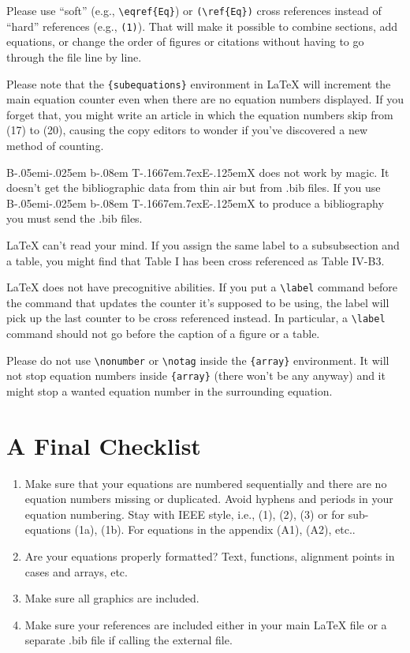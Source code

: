 \documentclass[lettersize,journal]{IEEEtran}
\def\BibTeX{{\rm B\kern-.05em{\sc i\kern-.025em b}\kern-.08em
    T\kern-.1667em\lower.7ex\hbox{E}\kern-.125emX}}
\begin{document}
Please use ``soft'' (e.g., \verb|\eqref{Eq}|) or \verb|(\ref{Eq})|
cross references instead of ``hard'' references (e.g., \verb|(1)|).
That will make it possible to combine sections, add equations, or
change the order of figures or citations without having to go through
the file line by line.

Please note that the \verb|{subequations}| environment in {\LaTeX}
will increment the main equation counter even when there are no
equation numbers displayed. If you forget that, you might write an
article in which the equation numbers skip from (17) to (20), causing
the copy editors to wonder if you've discovered a new method of
counting.

{\BibTeX} does not work by magic. It doesn't get the bibliographic
data from thin air but from .bib files. If you use {\BibTeX} to produce a
bibliography you must send the .bib files. 

{\LaTeX} can't read your mind. If you assign the same label to a
subsubsection and a table, you might find that Table I has been cross
referenced as Table IV-B3. 

{\LaTeX} does not have precognitive abilities. If you put a
\verb|\label| command before the command that updates the counter it's
supposed to be using, the label will pick up the last counter to be
cross referenced instead. In particular, a \verb|\label| command
should not go before the caption of a figure or a table.

Please do not use \verb|\nonumber| or \verb|\notag| inside the
\verb|{array}| environment. It will not stop equation numbers inside
\verb|{array}| (there won't be any anyway) and it might stop a wanted
equation number in the surrounding equation.

\balance

\section{A Final Checklist}
\begin{enumerate}{}{}
\item{Make sure that your equations are numbered sequentially and there are no equation numbers missing or duplicated. Avoid hyphens and periods in your equation numbering. Stay with IEEE style, i.e., (1), (2), (3) or for sub-equations (1a), (1b). For equations in the appendix (A1), (A2), etc.}. 
\item{Are your equations properly formatted? Text, functions, alignment points in cases and arrays, etc. }
\item{Make sure all graphics are included.}
\item{Make sure your references are included either in your main LaTeX file or a separate .bib file if calling the external file.}
\end{enumerate}
\end{document}

